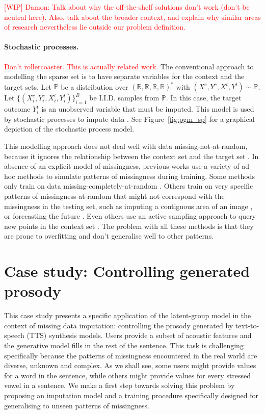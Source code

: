 \documentclass[a4paper,12pt,twoside,openright]{article}
\newcommand{\crit}[1]{\textcolor{red}{#1}}
\begin{document}
\crit{[WIP] Damon: Talk about why the off-the-shelf solutions don't work (don't be neutral here). Also, talk about the broader context, and explain why similar areas of research nevertheless lie outside our problem definition.}

\paragraph{Stochastic processes.} \crit{Don't rollercoaster. This is actually related work.} The conventional approach to modelling the sparse set is to have separate variables for the context and the target sets. Let $\mathbb{P}$ be a distribution over $(\mathbb{R}, \mathbb{R}, \mathbb{R}, \mathbb{R})^*$ with $(X^c, Y^c, X^t, Y^t) \sim \mathbb{P}$. Let $\{(X^c_i, Y^c_i, X^t_i, Y^t_i)\}_{i=1}^{B}$ be I.I.D. samples from $\mathbb{P}$. In this case, the target outcome $Y^t_i$ is an unobserved variable that must be imputed. This model is used by stochastic processes to impute data \parencite{jafrastehGaussianProcessesMissing2022, garneloConditionalNeuralProcesses2018}. See Figure~\ref{fig:pgm_sp} for a graphical depiction of the stochastic process model.

This modelling approach does not deal well with data missing-not-at-random, because it ignores the relationship between the context set and the target set \parencite{duBayesianLatentVariable2022}. In absence of an explicit model of missingness, previous works use a variety of ad-hoc methods to simulate patterns of missingness during training. Some methods only train on data missing-completely-at-random \parencite{jafrastehGaussianProcessesMissing2022}. Others train on very specific patterns of missingness-at-random that might not correspond with the missingness in the testing set, such as imputing a contiguous area of an image \parencite{lugmayrRePaintInpaintingUsing2022}, or forecasting the future \parencite{zivotVectorAutoregressiveModels2003}. Even others use an active sampling approach to query new points in the context set \parencite{maEDDIEfficientDynamic2019}. The problem with all these methods is that they are prone to overfitting and don't generalise well to other patterns.

\section{Case study: Controlling generated prosody}

This case study presents a specific application of the latent-group model in the context of missing data imputation: controlling the prosody generated by text-to-speech (TTS) synthesis models. Users provide a subset of acoustic features and the generative model fills in the rest of the sentence. This task is challenging specifically because the patterns of missingness encountered in the real world are diverse, unknown and complex. As we shall see, some users might provide values for a word in the sentence, while others might provide values for every stressed vowel in a sentence. We make a first step towards solving this problem by proposing an imputation model and a training procedure specifically designed for generalising to unseen patterns of missingness.
\end{document}
